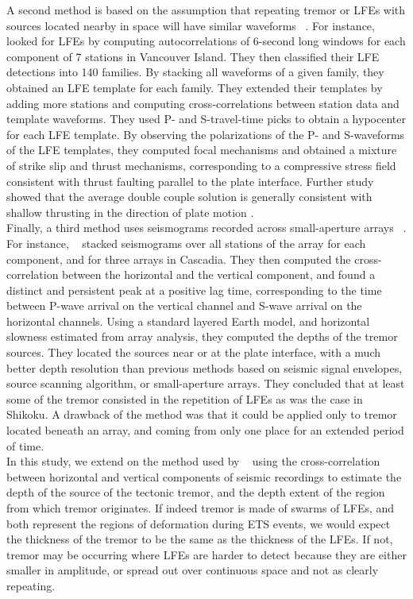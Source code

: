 \documentclass[draft]{agujournal2019}
\begin{document}
A second method is based on the assumption that repeating tremor or LFEs with sources located nearby in space will have similar waveforms ~\cite{BOS_2012, ROY_2014, SHE_2006, SHE_2007_nature}. For instance, ~ looked for LFEs by computing autocorrelations of 6-second long windows for each component of 7 stations in Vancouver Island. They then classified their LFE detections into 140 families. By stacking all waveforms of a given family, they obtained an LFE template for each family. They extended their templates by adding more stations and computing cross-correlations between station data and template waveforms. They used P- and S-travel-time picks to obtain a hypocenter for each LFE template. By observing the polarizations of the P- and S-waveforms of the LFE templates, they computed focal mechanisms and obtained a mixture of strike slip and thrust mechanisms, corresponding to a compressive stress field consistent with thrust faulting parallel to the plate interface. Further study showed that the average double couple solution is generally consistent with shallow thrusting in the direction of plate motion \cite{ROY_2014}. \\

Finally, a third method uses seismograms recorded across small-aperture arrays ~\cite{GHO_2010_GRL, LAR_2009}. For instance, ~ stacked seismograms over all stations of the array for each component, and for three arrays in Cascadia. They then computed the cross-correlation between the horizontal and the vertical component, and found a distinct and persistent peak at a positive lag time, corresponding to the time between P-wave arrival on the vertical channel and S-wave arrival on the horizontal channels. Using a standard layered Earth model, and horizontal slowness estimated from array analysis, they computed the depths of the tremor sources. They located the sources near or at the plate interface, with a much better depth resolution than previous methods based on seismic signal envelopes, source scanning algorithm, or small-aperture arrays. They concluded that at least some of the tremor consisted in the repetition of LFEs as was the case in Shikoku. A drawback of the method was that it could be applied only to tremor located beneath an array, and coming from only one place for an extended period of time. \\

In this study, we extend on the method used by ~ using the cross-correlation between horizontal and vertical components of seismic recordings to estimate the depth of the source of the tectonic tremor, and the depth extent of the region from which tremor originates. If indeed tremor is made of swarms of LFEs, and both represent the regions of deformation during ETS events, we would expect the thickness of the tremor to be the same as the thickness of the LFEs. If not, tremor may be occurring where LFEs are harder to detect because they are either smaller in amplitude, or spread out over continuous space and not as clearly repeating.
\end{document}
